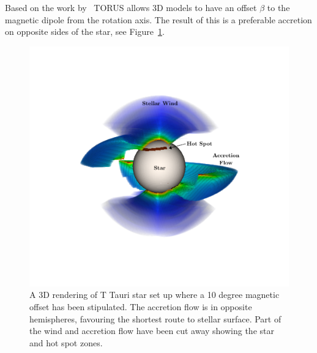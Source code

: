 \documentclass[fleqn,usenatbib]{mnras}
\begin{document}
Based on the work by~\citet{Mahdavi:1998fw} TORUS allows 3D models to have an offset $\beta$ to the magnetic dipole from the rotation axis. The result of this is a preferable accretion on opposite sides of the star, see Figure~\ref{fig:3Doffset}.
\begin{figure}
    \centering
    \includegraphics[width=\linewidth,trim={2cm 1cm 2cm 1cm},clip]{figures/3Doffset}
    \caption{A 3D rendering of T Tauri star set up where a 10 degree magnetic offset has been stipulated. The accretion flow is in opposite hemispheres, favouring the shortest route to stellar surface. Part of the wind and accretion flow have been cut away showing the star and hot spot zones.}
    \label{fig:3Doffset}
\end{figure}
\end{document}
